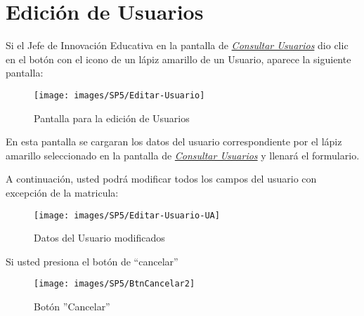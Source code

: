 \begin{itemize}
                \end{itemize}

\newpage

            \section{Edición de Usuarios} 
                Si el Jefe de Innovación Educativa en la pantalla de \hyperlink{consultarUs}{\textit{Consultar Usuarios}} dio clic en el botón con el icono de un lápiz amarillo de un Usuario, aparece la siguiente pantalla:
                
                \begin{figure}[!hbtp]
                    \centering
                    \hypertarget{editarUs}{\texttt{[image: images/SP5/Editar-Usuario]}}
                    \caption{Pantalla para la edición de Usuarios}
                    \label{editarrh}
                \end{figure}
                
                En esta pantalla se cargaran los datos del usuario correspondiente por el lápiz amarillo seleccionado en la pantalla de \hyperlink{consultarUs}{\textit{Consultar Usuarios}} y llenará el formulario.
            
                A continuación, usted podrá modificar todos los campos del usuario con excepción de la matricula:
                \begin{figure}[!hbtp]
                    \centering
                    \hypertarget{modif}{\texttt{[image: images/SP5/Editar-Usuario-UA]}}
                    \caption{Datos del Usuario modificados}
                    \label{modif}
                \end{figure}
                
                Si usted presiona el botón de “cancelar”
                
                \begin{figure}[!hbtp]
                    \centering
                    \hypertarget{cancel2}{\texttt{[image: images/SP5/BtnCancelar2]}}
                    \caption{Botón ''Cancelar''}
                    \label{cancel2}
                \end{figure}
                
